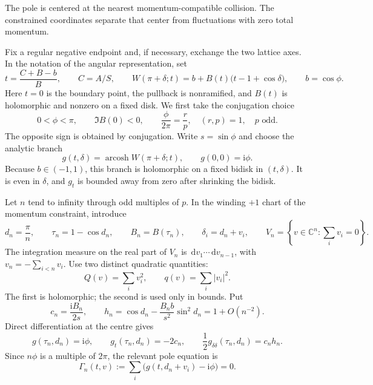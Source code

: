 \documentclass[11pt]{article}
\numberwithin{equation}{section}
\theoremstyle{definition}
\newcommand{\C}{\mathbb C}
\newcommand{\dd}{\,\mathrm d}
\newcommand{\ii}{\mathrm i}
\begin{document}
The pole is centered at the nearest momentum-compatible collision.
The constrained coordinates separate that center from fluctuations with
zero total momentum.

Fix a regular negative endpoint and, if necessary, exchange the two lattice
axes.  In the notation of the angular representation, set
\begin{equation}
 t=\frac{C+B-b}{B},\qquad C=A/S,\qquad
 W(\pi+\delta;t)=b+B(t)\bigl(t-1+\cos\delta\bigr),
 \qquad b=\cos\phi.
 \label{eq:morse-coordinate}
\end{equation}
Here $t=0$ is the boundary point, the pullback is nonramified, and $B(t)$
is holomorphic and nonzero on a fixed disk.  We first take the conjugation
choice
\begin{equation}
 0<\phi<\pi,\qquad \Im B(0)<0,\qquad
 \frac{\phi}{2\pi}=\frac rp,\quad (r,p)=1,\quad p\text{ odd}.
 \label{eq:morse-rational-phase}
\end{equation}
The opposite sign is obtained by conjugation.  Write $s=\sin\phi$ and choose
the analytic branch
\begin{equation}
 g(t,\delta)=\operatorname{arcosh}W(\pi+\delta;t),
 \qquad g(0,0)=\ii\phi.
 \label{eq:morse-g}
\end{equation}
Because $b\in(-1,1)$, this branch is holomorphic on a fixed bidisk in
$(t,\delta)$.  It is even in $\delta$, and $g_t$ is bounded away from zero
after shrinking the bidisk.

Let $n$ tend to infinity through odd multiples of $p$.  In the winding
$+1$ chart of the momentum constraint, introduce
\begin{equation}
 d_n=\frac\pi n,\qquad \tau_n=1-\cos d_n,\qquad
 B_n=B(\tau_n),\qquad
 \delta_i=d_n+v_i,\qquad
 V_n=\left\{v\in\C^n:\sum_i v_i=0\right\}.
 \label{eq:morse-centre}
\end{equation}
The integration measure on the real part of $V_n$ is
$\dd v_1\cdots\dd v_{n-1}$, with $v_n=-\sum_{i<n}v_i$.
Use two distinct quadratic quantities:
\begin{equation}
 Q(v)=\sum_i v_i^2,\qquad q(v)=\sum_i|v_i|^2.
 \label{eq:morse-two-quadratics}
\end{equation}
The first is holomorphic; the second is used only in bounds.
Put
\begin{equation}
 c_n=\frac{\ii B_n}{2s},\qquad
 h_n=\cos d_n-\frac{B_n b}{s^2}\sin^2d_n=1+O(n^{-2}).
 \label{eq:morse-h}
\end{equation}
Direct differentiation at the centre gives
\begin{equation}
 g(\tau_n,d_n)=\ii\phi,\qquad
 g_t(\tau_n,d_n)=-2c_n,\qquad
 \frac12g_{\delta\delta}(\tau_n,d_n)=c_nh_n.
 \label{eq:morse-centre-derivatives}
\end{equation}
Since $n\phi$ is a multiple of $2\pi$, the relevant pole equation is
\begin{equation}
 \Gamma_n(t,v):=\sum_i\bigl(g(t,d_n+v_i)-\ii\phi\bigr)=0.
 \label{eq:morse-pole-equation}
\end{equation}
\end{document}
